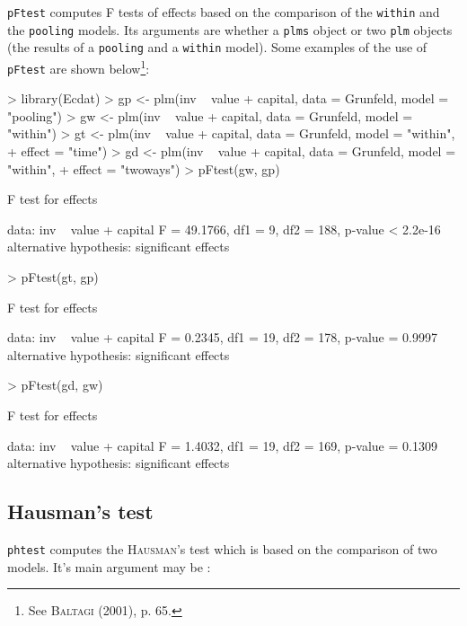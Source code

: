 \documentclass[a4paper]{article}
\begin{document}
\texttt{pFtest} computes F tests of effects based on the comparison of
the  \texttt{within} and the \texttt{pooling} models. Its arguments
are whether a \texttt{plms} object or two \texttt{plm} objects
(the results of a  \texttt{pooling} and a \texttt{within} model).
Some examples of the use of \texttt{pFtest} are shown below\footnote{See \textsc{Baltagi} (2001),
  p. 65.}:

\begin{Schunk}
\begin{Sinput}
> library(Ecdat)
> gp <- plm(inv ~ value + capital, data = Grunfeld, model = "pooling")
> gw <- plm(inv ~ value + capital, data = Grunfeld, model = "within")
> gt <- plm(inv ~ value + capital, data = Grunfeld, model = "within", 
+     effect = "time")
> gd <- plm(inv ~ value + capital, data = Grunfeld, model = "within", 
+     effect = "twoways")
> pFtest(gw, gp)
\end{Sinput}
\begin{Soutput}
	F test for effects

data:  inv ~ value + capital 
F = 49.1766, df1 = 9, df2 = 188, p-value < 2.2e-16
alternative hypothesis: significant effects 
\end{Soutput}
\begin{Sinput}
> pFtest(gt, gp)
\end{Sinput}
\begin{Soutput}
	F test for effects

data:  inv ~ value + capital 
F = 0.2345, df1 = 19, df2 = 178, p-value = 0.9997
alternative hypothesis: significant effects 
\end{Soutput}
\begin{Sinput}
> pFtest(gd, gw)
\end{Sinput}
\begin{Soutput}
	F test for effects

data:  inv ~ value + capital 
F = 1.4032, df1 = 19, df2 = 169, p-value = 0.1309
alternative hypothesis: significant effects 
\end{Soutput}
\end{Schunk}



\subsection{Hausman's test}

\texttt{phtest} computes the \textsc{Hausman}'s test which is based on
the  comparison of two models. It's main argument may be :
\end{document}
